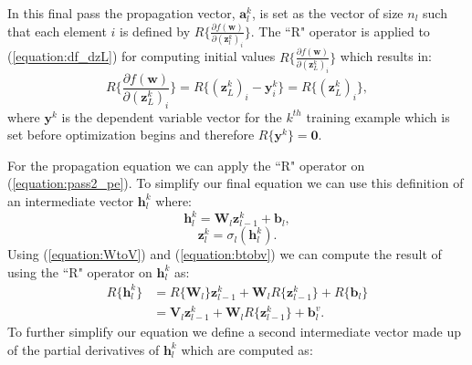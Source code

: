 \documentclass[letterpaper,12pt,titlepage,oneside,final]{book}
\begin{document}
	In this final pass the propagation vector, $\mathbf{a}_{l}^{k}$, is set as the vector of size $n_{l}$ such that each element $i$ is defined by $R\{\frac{\partial{f(\mathbf{w})}}{\partial{(\mathbf{z}_{l}^{k})_{i}}}\}$. The ``R" operator is applied to (\ref{equation:df_dzL}) for computing initial values $R\{\frac{\partial{f(\mathbf{w})}}{\partial{(\mathbf{z}_{L}^{k})_{i}}}\}$ which results in:
	\begin{equation}
	R\{\frac{\partial{f(\mathbf{w})}}{\partial{(\mathbf{z}_{L}^{k})_{i}}}\} = R\{(\mathbf{z}_{L}^{k})_{i} - \mathbf{y}_{i}^{k}\} = R\{(\mathbf{z}_{L}^{k})_{i}\},
	\end{equation}
	where $\mathbf{y}^{k}$ is the dependent variable vector for the $k^{th}$ training example which is set before optimization begins and therefore $R\{\mathbf{y}^{k}\} = \mathbf{0}$.
	
	For the propagation equation we can apply the ``R" operator on (\ref{equation:pass2_pe}). To simplify our final equation we can use this definition of an intermediate vector $\mathbf{h}_{l}^{k}$ where:
	\begin{equation}
	\mathbf{h}_{l}^{k} = \mathbf{W}_{l}\mathbf{z}_{l-1}^{k} + \mathbf{b}_{l},
	\end{equation}
	\begin{equation}
	\mathbf{z}_{l}^{k} = \sigma_{l}(\mathbf{h}_{l}^{k}).
	\end{equation}
	Using (\ref{equation:WtoV}) and (\ref{equation:btobv}) we can compute the result of using the ``R" operator on $\mathbf{h}_{l}^{k}$ as:
	\begin{equation}
	\begin{split}
	R\{\mathbf{h}_{l}^{k}\} & = R\{\mathbf{W}_{l}\}\mathbf{z}_{l-1}^{k} + \mathbf{W}_{l}R\{\mathbf{z}_{l-1}^{k}\} + R\{\mathbf{b}_{l}\}\\
	& = \mathbf{V}_{l}\mathbf{z}_{l-1}^{k} + \mathbf{W}_{l}R\{\mathbf{z}_{l-1}^{k}\} + \mathbf{b}_{l}^{v}.
	\label{equation:rh}
	\end{split}
	\end{equation}
	To further simplify our equation we define a second intermediate vector made up of the partial derivatives of $\mathbf{h}_{l}^{k}$ which are computed as:
	
\end{document}
